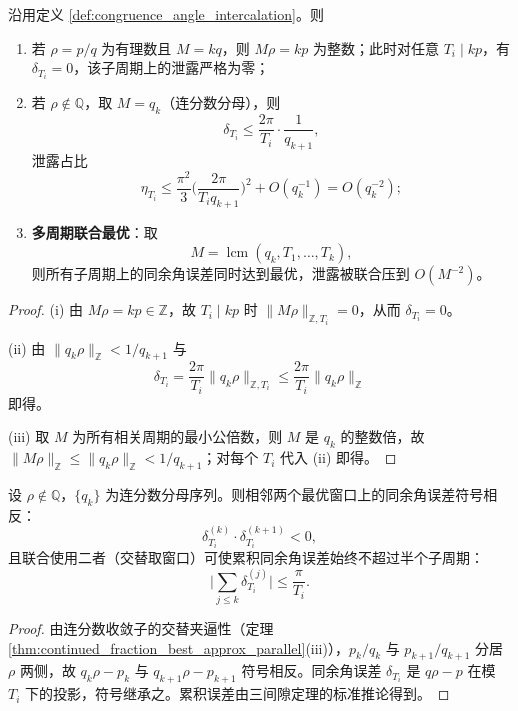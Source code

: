 \begin{theorem}[同余角置闰的最优性]\label{thm:congruence_angle_intercalation_optimal}
沿用定义 \ref{def:congruence_angle_intercalation}。则
\begin{enumerate}[label=(\roman*)]
    \item 若 $\rho=p/q$ 为有理数且 $M=kq$，则 $M\rho=kp$ 为整数；此时对任意 $T_i\mid kp$，有 $\delta_{T_i}=0$，该子周期上的泄露严格为零；
    \item 若 $\rho\notin\mathbb{Q}$，取 $M=q_k$（连分数分母），则
    \[
    \delta_{T_i}\le\frac{2\pi}{T_i}\cdot\frac{1}{q_{k+1}},
    \]
    泄露占比
    \[
    \eta_{T_i}\le\frac{\pi^2}{3}\Big(\frac{2\pi}{T_i q_{k+1}}\Big)^2+O(q_k^{-1})=O(q_k^{-2});
    \]
    \item \textbf{多周期联合最优}：取
    \[
    M=\operatorname{lcm}(q_k,T_1,\dots,T_k),
    \]
    则所有子周期上的同余角误差同时达到最优，泄露被联合压到 $O(M^{-2})$。
\end{enumerate}
\end{theorem}

\begin{proof}
(i) 由 $M\rho=kp\in\mathbb{Z}$，故 $T_i\mid kp$ 时 $\|M\rho\|_{\mathbb{Z},T_i}=0$，从而 $\delta_{T_i}=0$。

(ii) 由 $\|q_k\rho\|_{\mathbb{Z}}<1/q_{k+1}$ 与
\[
\delta_{T_i}=\frac{2\pi}{T_i}\|q_k\rho\|_{\mathbb{Z},T_i}
\le\frac{2\pi}{T_i}\|q_k\rho\|_{\mathbb{Z}}
\]
即得。

(iii) 取 $M$ 为所有相关周期的最小公倍数，则 $M$ 是 $q_k$ 的整数倍，故 $\|M\rho\|_{\mathbb{Z}}\le\|q_k\rho\|_{\mathbb{Z}}<1/q_{k+1}$；对每个 $T_i$ 代入 (ii) 即得。
\end{proof}

\begin{proposition}[上下限逼近与同余角夹逼]\label{prop:congruence_angle_sandwich}
设 $\rho\notin\mathbb{Q}$，$\{q_k\}$ 为连分数分母序列。则相邻两个最优窗口上的同余角误差符号相反：
\[
\delta_{T_i}^{(k)}\cdot\delta_{T_i}^{(k+1)}<0,
\]
且联合使用二者（交替取窗口）可使累积同余角误差始终不超过半个子周期：
\[
\Big|\sum_{j\le k}\delta_{T_i}^{(j)}\Big|\le\frac{\pi}{T_i}.
\]
\end{proposition}

\begin{proof}
由连分数收敛子的交替夹逼性（定理 \ref{thm:continued_fraction_best_approx_parallel}(iii)），$p_k/q_k$ 与 $p_{k+1}/q_{k+1}$ 分居 $\rho$ 两侧，故 $q_k\rho-p_k$ 与 $q_{k+1}\rho-p_{k+1}$ 符号相反。同余角误差 $\delta_{T_i}$ 是 $q\rho-p$ 在模 $T_i$ 下的投影，符号继承之。累积误差由三间隙定理的标准推论得到。
\end{proof}

